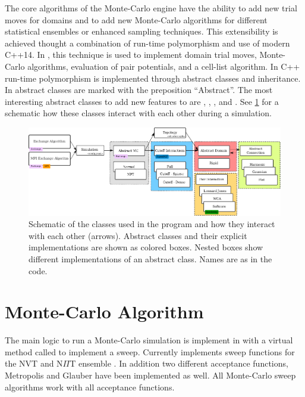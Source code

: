 \documentclass[12pt, twoside]{report}
\begin{document}
The core algorithms of the Monte-Carlo engine have the ability to add new trial
moves for domains and to add new Monte-Carlo algorithms for different
statistical ensembles or enhanced sampling techniques. This extensibility is
achieved thought a combination of run-time polymorphism and use of modern
\mbox{C++14}. In \complexes, this technique is used to implement domain trial
moves, Monte-Carlo algorithms, evaluation of pair potentials, and a cell-list
algorithm. In \mbox{C++} run-time polymorphism is implemented through abstract
classes and inheritance. In \complexes abstract classes are marked with the
preposition ``Abstract''. The most interesting abstract classes to add new
features to \complexes are ,
, ,
 and . See
\cref{fig:Complexes} for a schematic how these classes interact with each other
during a simulation.
\begin{figure}[!ht] \centering
\includegraphics[width=\textwidth]{figures/software-model}
\caption[Complexes software overview.]{Schematic of the classes used in the
\complexes program and how they interact with each other (arrows). Abstract
classes and their explicit implementations are shown as colored boxes. Nested
boxes show different implementations of an abstract class. Names are as in the
code.}
\label{fig:Complexes}
\end{figure}

\section{Monte-Carlo Algorithm}

The main logic to run a Monte-Carlo simulation is implement in
 with a virtual method called  to
implement a sweep. Currently \complexes implements sweep functions for the NVT
and N\(\Pi\)T ensemble \cite{frenkel2001understanding}. In addition two
different acceptance functions, Metropolis \cite{metropolis1953} and Glauber
\cite{Glauber1963} have been implemented as well. All Monte-Carlo sweep
algorithms work with all acceptance functions.
\end{document}
